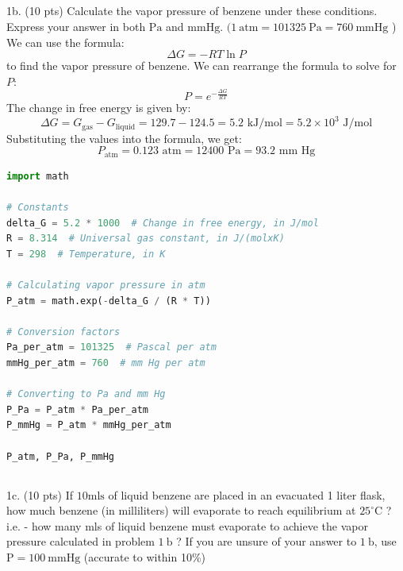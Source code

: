 \documentclass[12 pt]{article}
\begin{document}
\subsection{}
1b. (10 pts) Calculate the vapor pressure of benzene under these conditions. Express your answer in both $\mathrm{Pa}$ and $\mathrm{mm} \mathrm{Hg}$. $(1 \mathrm{~atm}=101325 \mathrm{~Pa}=760 \mathrm{~mm} \mathrm{Hg}$ )\\
We can use the formula:
\begin{equation}
  \Delta G = -RT \ln P
\end{equation}
to find the vapor pressure of benzene. We can rearrange the formula to solve for $P$:
\begin{equation}
  P = e^{-\frac{\Delta G}{RT}}
\end{equation}
The change in free energy is given by:
\begin{equation}
  \Delta G = G_{\text{gas}} - G_{\text{liquid}} = 129.7 - 124.5 = 5.2 \text{ kJ/mol} = 5.2 \times 10^3 \text{ J/mol}
\end{equation}
Substituting the values into the formula, we get:
\begin{equation}
  P_\text{atm} = 0.123 \text{ atm} = 12400 \text{ Pa} = 93.2 \text{ mm Hg}
\end{equation}
\begin{lstlisting}[language=Python]
import math

# Constants
delta_G = 5.2 * 1000  # Change in free energy, in J/mol
R = 8.314  # Universal gas constant, in J/(molxK)
T = 298  # Temperature, in K

# Calculating vapor pressure in atm
P_atm = math.exp(-delta_G / (R * T))

# Conversion factors
Pa_per_atm = 101325  # Pascal per atm
mmHg_per_atm = 760  # mm Hg per atm

# Converting to Pa and mm Hg
P_Pa = P_atm * Pa_per_atm
P_mmHg = P_atm * mmHg_per_atm

P_atm, P_Pa, P_mmHg

\end{lstlisting}
\subsection{}
1c. (10 pts) If $10 \mathrm{mls}$ of liquid benzene are placed in an evacuated 1 liter flask, how much benzene (in milliliters) will evaporate to reach equilibrium at $25^{\circ} \mathrm{C}$ ? i.e. - how many mls of liquid benzene must evaporate to achieve the vapor pressure calculated in problem $1 \mathrm{~b}$ ? If you are unsure of your answer to $1 \mathrm{~b}$, use $\mathrm{P}=100 \mathrm{~mm} \mathrm{Hg}$ (accurate to within 10\%)
\end{document}
